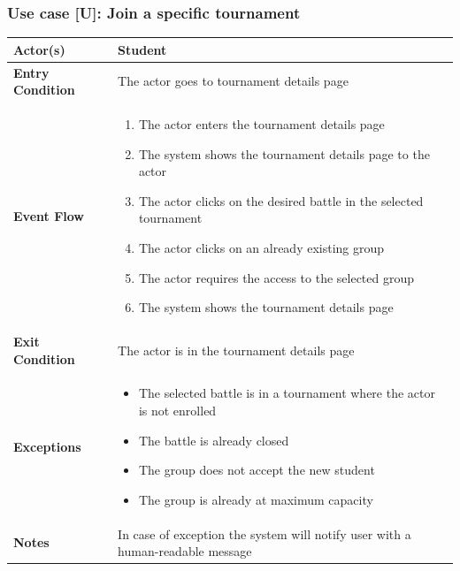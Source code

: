 \documentclass[12pt, a4paper]{report}
\newcounter{useCase}
\newcommand{\usecase}[9]{
    \def\arraystretch{1.5} 
    \subsubsection*{Use case [U#2]: #3}
    \vspace*{0.2cm}
    \begin{center}
        \begin{tabular}{|l|p{12cm}|}
            \hline
            \textbf{Actor(s)} & #4 \\
            \hline
            \textbf{Entry Condition} & #5 \\
            \hline
            \textbf{Event Flow} & #6 \\
            \hline
            \textbf{Exit Condition} & #7 \\
            \hline
            \textbf{Exceptions} & #8 \\
            \hline
            \textbf{Notes} & #9 \\
            \hline
        \end{tabular}
    \end{center}
    #1
}
\begin{document}
        \usecase{%
        }        
        {\arabic{useCase}\stepcounter{useCase}}
        {Join a specific tournament}
        {Student}
        {The actor goes to tournament details page}
        {
        \begin{enumerate}
            \item The actor enters the tournament details page
            \item The system shows the tournament details page to the actor
            \item The actor clicks on the desired battle in the selected tournament
            \item The actor clicks on an already existing group
            \item The actor requires the access to the selected group
            \item The system shows the tournament details page 
        \end{enumerate}
        }
        {The actor is in the tournament details page}
        {
        \begin{itemize}
            \item The selected battle is in a tournament where the actor is not enrolled
            \item The battle is already closed
            \item The group does not accept the new student
            \item The group is already at maximum capacity
        \end{itemize}
        }
        {In case of exception the system will notify user with a human-readable message}
\end{document}
